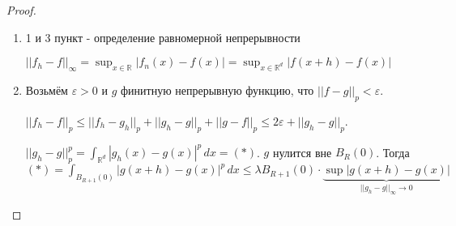 \begin{proof}
    \begin{enumerate}
        \item {
            1 и 3 пункт - определение равномерной непрерывности

            $||f_h - f||_\infty = \sup_{x \in \mathbb{R}} |f_n(x) - f(x)| = \sup_{x \in \mathbb{R}^d} |f(x + h) - f(x)|$
        }
        \item {
            Возьмём $\varepsilon > 0$ и $g$ финитную непрерывную функцию, что $||f - g||_p < \varepsilon$.

            $||f_h - f||_p \leqslant ||f_h - g_h ||_p + ||g_h - g||_p + ||g - f||_p \leqslant 2\varepsilon + ||g_h - g||_p$.

            $||g_h - g||_p^p = \int_{\mathbb{R}^d} |g_h(x) - g(x)|^p \, dx = (*)$. $g$ нулится вне $B_R (0)$. Тогда
            $(*) = \int_{B_{R + 1}(0)} |g(x + h) - g(x)|^p \, dx \leqslant \lambda B_{R + 1} (0) \cdot \underbrace{\sup |g(x + h) - g(x)|}_{||g_h - g||_{\infty} \rightarrow 0}$
        }
    \end{enumerate}

\end{proof}
